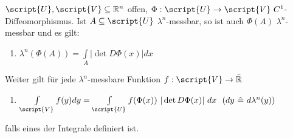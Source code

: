   \begin{theorem}[Transformationsformel]
    $\script{U}, \script{V} \subseteq\mathbb{R}^n$ offen, $\Phi:\script{U} \to \script{V} \ C^1$-Diffeomorphismus. Ist $A \subseteq \script{U}$ $\lambda^n$-messbar, so ist auch $\Phi(A)$ $\lambda^n$-messbar und es gilt:
    \begin{enumerate}
      \item $\lambda^n(\Phi(A)) = \int\limits_A | \det D\Phi(x) | dx$
    \end{enumerate}
    Weiter gilt für jede $\lambda^n$-messbare Funktion $f: \script{V} \to \bar{\mathbb{R}}$
    \begin{enumerate}[resume]
      \item $\int\limits_{\script{V}} f(y) dy = \int\limits_{\script{U}} f(\Phi(x)) \ |\det D\Phi(x)| \ dx \ \ (dy \ \hat{=} \ d\lambda^n(y))$
    \end{enumerate}
    falls eines der Integrale definiert ist.
  \end{theorem}

